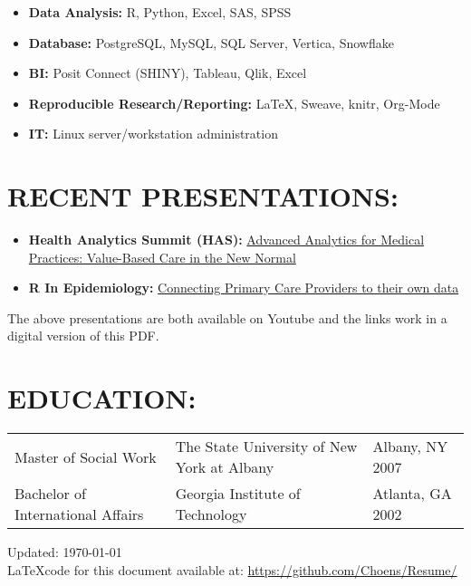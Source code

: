 \documentclass[line, mm, 10pt]{res}
\begin{document}
\begin{resume}
  \begin{itemize}
    \item {\bf Data Analysis:} R, Python, Excel, SAS, SPSS
    \item {\bf Database:} PostgreSQL, MySQL, SQL Server, Vertica, Snowflake
    \item {\bf BI:} Posit Connect (SHINY), Tableau, Qlik, Excel 
    \item {\bf Reproducible Research/Reporting:} \LaTeX, Sweave, knitr, Org-Mode
    \item {\bf IT:} Linux server/workstation administration 
  \end{itemize}

  \section{RECENT PRESENTATIONS:}
  \begin{itemize}
    \item {\bf Health Analytics Summit (HAS):} {\href{https://www.youtube.com/watch?v=--vqwbJucPs}{Advanced Analytics for Medical Practices: Value-Based Care in the New Normal}}
    \item {\bf R In Epidemiology:} {\href{https://www.youtube.com/watch?v=-zhTXiiCj58}{Connecting Primary Care Providers to their own data}}
    \end{itemize}

    The above presentations are both available on Youtube and the
    links work in a digital version of this PDF.
  
  \section{EDUCATION:}
  \begin{tabular} {p{2.25in} p{2.75in} p{2in}}
    Master of Social Work & The State University of New  York at Albany & Albany, NY 2007 \\
    Bachelor of International Affairs & Georgia Institute of Technology & Atlanta, GA 2002 \\
  \end{tabular}


\end{resume}

\vspace{.25in}
Updated: \today \\
\LaTeX code for this document available at:
\href{https://github.com/Choens/Resume/}{https://github.com/Choens/Resume/}
\end{document}
